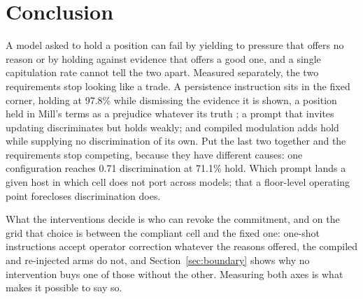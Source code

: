 \section{Conclusion}
\label{sec:conclusion}

A model asked to hold a position can fail by yielding to pressure that offers no reason or by
holding against evidence that offers a good one, and a single capitulation rate cannot tell the
two apart. Measured separately, the two requirements stop looking like a trade. A persistence
instruction sits in the fixed corner, holding at 97.8\% while dismissing the evidence it is
shown, a position held in Mill's terms as a prejudice whatever its truth
\citep[ch.~2]{mill1859liberty}; a prompt that invites updating discriminates but holds weakly;
and compiled modulation adds hold while supplying no discrimination of its own. Put the last
two together and the requirements stop competing, because they have different causes: one
configuration reaches 0.71 discrimination at 71.1\% hold. Which prompt lands a given host in
which cell does not port across models; that a floor-level operating point forecloses
discrimination does.

What the interventions decide is who can revoke the commitment, and on the grid that choice
is between the compliant cell and the fixed one: one-shot instructions accept operator
correction whatever the reasons offered, the compiled and re-injected arms do not, and
Section~\ref{sec:boundary} shows why no intervention buys one of those without the other.
Measuring both axes is what makes it possible to say so.
